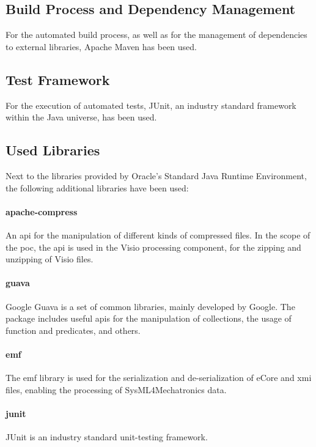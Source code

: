 \subsection{Build Process and Dependency Management}

For the automated build process, as well as for the management of dependencies to external libraries, Apache Maven has been used.

\subsection{Test Framework}

For the execution of automated tests, JUnit, an industry standard framework within the Java universe, has been used.

\subsection{Used Libraries}

Next to the libraries provided by Oracle's Standard Java Runtime Environment, the following additional libraries have been used:

\paragraph{apache-compress} An \gls{api} for the manipulation of different kinds of compressed files. In the scope of the \gls{poc}, the \gls{api} is used in the Visio processing component, for the zipping and unzipping of Visio files.

\paragraph{guava} Google Guava is a set of common libraries, mainly developed by Google. The package includes useful \glspl{api} for the manipulation of collections, the usage of function and predicates, and others.

\paragraph{emf} The \gls{emf} library is used for the serialization and de-serialization of eCore and \gls{xmi} files, enabling the processing of SysML4Mechatronics data.

\paragraph{junit} JUnit is an industry standard unit-testing framework.

